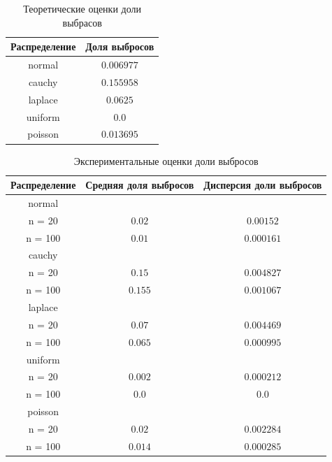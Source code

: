 \documentclass[a4]{article}
\begin{document}
\begin{center}
\begin{table}[H]
    \caption{Теоретические оценки доли выбрасов}
    \label{tab:my_label}
    \begin{center}
    \vspace{5mm}
    \begin{tabular}{|c|c|}
    \hline
    Распределение & Доля выбросов\\
    \hline
         normal	& $0.006977$\\
         \hline
cauchy & $0.155958$\\
\hline
laplace	& $0.0625$\\
\hline
uniform	& $0.0$\\
\hline
poisson	& $0.013695$\\
\hline
    \end{tabular}
    
    \end{center}
    
\end{table}

\begin{table}[H]
	
	\caption{Экспериментальные оценки доли выбросов}
	\label{tab:my_label}
	\begin{center}
		\vspace{5mm}
		\begin{tabular}{|c|c|c|}
			\hline
			Распределение & Средняя доля выбросов & Дисперсия доли выбросов\\
			\hline
			normal	& &\\
			\hline
			n = 20   & 	$0.02$ &  $ 0.00152 $ \\
			\hline
			n = 100   &	$0.01$ & $ 0.000161 $   \\
			\hline
			cauchy	& &\\
			\hline
			n = 20   & 	$0.15$ & $ 0.004827 $   \\
			\hline
			n = 100  & 	$0.155$  & $ 0.001067 $  \\
			\hline
			laplace	& &\\
			\hline
			n = 20    &	$0.07$  & $ 0.004469 $  \\
			\hline
			n = 100   &	$0.065$ & $ 0.000995 $   \\
			\hline
			uniform	& &\\
			\hline
			n = 20    &	$0.002$ & $ 0.000212 $   \\
			\hline
			n = 100   &	$0.0$ & $ 0.0 $  \\ 
			\hline
			poisson	& &\\
			\hline
			n = 20   & 	$0.02$ & $ 0.002284 $   \\
			\hline
			n = 100  & 	$0.014$ & $ 0.000285 $   \\
			\hline
		\end{tabular}
		
	\end{center}
	
\end{table}

\end{center}
\end{document}
